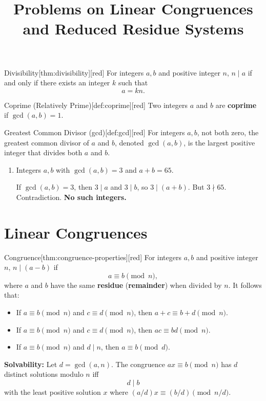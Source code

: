 \documentclass[11pt]{article}
\title{Problems on Linear Congruences and Reduced Residue Systems}
\begin{document}
\begin{define}{Divisibility}[thm:divisibility][red]
  For integers $a,b$ and positive integer $n$, $n\mid a$ if and only if there exists an integer $k$ such that
  \[
    a = kn.
  \]
\end{define}

\begin{define}{Coprime (Relatively Prime)}[def:coprime][red]
  Two integers $a$ and $b$ are \textbf{coprime} if $\gcd(a,b)=1$.
\end{define}

\begin{define}{Greatest Common Divisor (gcd)}[def:gcd][red]
  For integers $a,b$, not both zero, the greatest common divisor of $a$ and $b$, denoted $\gcd(a,b)$, is the largest positive integer that divides both $a$ and $b$.
\end{define}

\begin{enumerate}
\item Integers $a,b$ with $\gcd(a,b)=3$ and $a+b=65$.
\begin{subanswer}
  If $\gcd(a,b)=3$, then $3\mid a$ and $3\mid b$, so $3\mid(a+b)$. But $3\nmid65$. Contradiction. \textbf{No such integers.}
\end{subanswer}
\end{enumerate}


\section*{Linear Congruences}

\begin{define}{Congruence}[thm:congruence-properties][red]
  For integers $a,b$ and positive integer $n$, $n\mid(a-b)$ if
  \[
    a\equiv b\pmod n,
  \]
  where $a$ and $b$ have the same \textbf{residue} (\textbf{remainder}) when divided by $n$. 
  It follows that:
  \begin{itemize}
    \item If $a\equiv b\pmod n$ and $c\equiv d\pmod n$, then $a+c\equiv b+d\pmod n$.
    \item If $a\equiv b\pmod n$ and $c\equiv d\pmod n$, then $ac\equiv bd\pmod n$.
    \item If $a\equiv b\pmod n$ and $d\mid n$, then $a\equiv b\pmod d$.
  \end{itemize}
  \textbf{Solvability:} Let $d=\gcd(a,n)$. The congruence $ax\equiv b\pmod n$ has $d$ distinct solutions modulo $n$ iff 
  $$d\mid b$$
  with the least positive solution $x$ where $(a/d)x\equiv (b/d)\pmod{n/d}$.
\end{define}
\end{document}
